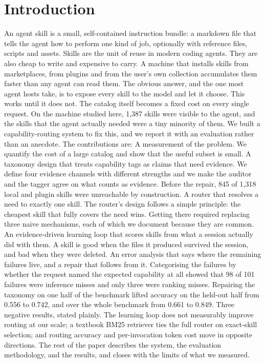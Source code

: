 \documentclass[sigconf,acmsmall]{acmart}
\begin{document}
\section{Introduction}
An agent skill is a small, self-contained instruction bundle: a markdown file that tells the agent how to perform one kind of job, optionally with reference files, scripts and assets. Skills are the unit of reuse in modern coding agents. They are also cheap to write and expensive to carry. A machine that installs skills from marketplaces, from plugins and from the user's own collection accumulates them faster than any agent can read them.
The obvious answer, and the one most agent hosts take, is to expose every skill to the model and let it choose. This works until it does not. The catalog itself becomes a fixed cost on every single request. On the machine studied here, 1,387 skills were visible to the agent, and the skills that the agent actually needed were a tiny minority of them.
We built a capability-routing system to fix this, and we report it with an evaluation rather than an anecdote. The contributions are:
A measurement of the problem. We quantify the cost of a large catalog and show that the useful subset is small.
A taxonomy design that treats capability tags as claims that need evidence. We define four evidence channels with different strengths and we make the auditor and the tagger agree on what counts as evidence. Before the repair, 845 of 1,318 local and plugin skills were unreachable by construction.
A router that resolves a need to exactly one skill. The router's design follows a simple principle: the cheapest skill that fully covers the need wins. Getting there required replacing three naive mechanisms, each of which we document because they are common.
An evidence-driven learning loop that scores skills from what a session actually did with them. A skill is good when the files it produced survived the session, and bad when they were deleted.
An error analysis that says where the remaining failures live, and a repair that follows from it. Categorising the failures by whether the request named the expected capability at all showed that 98 of 101 failures were inference misses and only three were ranking misses. Repairing the taxonomy on one half of the benchmark lifted accuracy on the held-out half from 0.556 to 0.742, and over the whole benchmark from 0.661 to 0.849.
Three negative results, stated plainly. The learning loop does not measurably improve routing at our scale; a textbook BM25 retriever ties the full router on exact-skill selection; and routing accuracy and per-invocation token cost move in opposite directions.
The rest of the paper describes the system, the evaluation methodology, and the results, and closes with the limits of what we measured.
\end{document}
